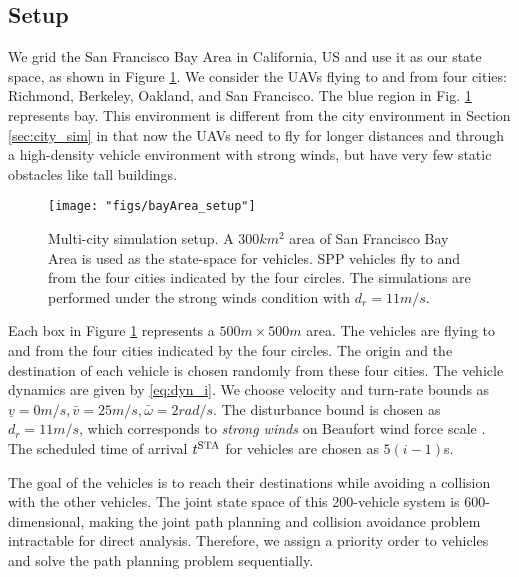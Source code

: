 \subsection{Setup \label{sec:bayArea_simSetup}}
We grid the San Francisco Bay Area in California, US and use it as our state space, as shown in Figure \ref{fig:bayArea_setup}. We consider the UAVs flying to and from four cities: Richmond, Berkeley, Oakland, and San Francisco. The blue region in Fig. \ref{fig:bayArea_setup} represents bay. This environment is different from the city environment in Section \ref{sec:city_sim} in that now the UAVs need to fly for longer distances and through a high-density vehicle environment with strong winds, but have very few static obstacles like tall buildings.    
%
\begin{figure}[H]
  \centering
  \texttt{[image: "figs/bayArea\_setup"]}
  \caption{Multi-city simulation setup. A $300 km^2$ area of San Francisco Bay Area is used as the state-space for vehicles. SPP vehicles fly to and from the four cities indicated by the four circles. The simulations are performed under the strong winds condition with $d_{r} = 11 m/s$.}
  \label{fig:bayArea_setup}
\end{figure}

Each box in Figure \ref{fig:bayArea_setup} represents a $500m \times 500m$ area. The vehicles are flying to and from the four cities indicated by the four circles. The origin and the destination of each vehicle is chosen randomly from these four cities. The vehicle dynamics are given by \eqref{eq:dyn_i}. We choose velocity and turn-rate bounds as $\underline{v} = 0m/s, \bar{v} = 25m/s, \bar\omega = 2 rad/s$. The disturbance bound is chosen as $d_{r} = 11 m/s$, which corresponds to \textit{strong winds} on Beaufort wind force scale \cite{Windscale}. The scheduled time of arrival $t^\text{STA}$ for vehicles are chosen as $5(i-1)$s.

The goal of the vehicles is to reach their destinations while avoiding a collision with the other vehicles. The joint state space of this 200-vehicle system is 600-dimensional, making the joint path planning and collision avoidance problem intractable for direct analysis. Therefore, we assign a priority order to vehicles and solve the path planning problem sequentially.